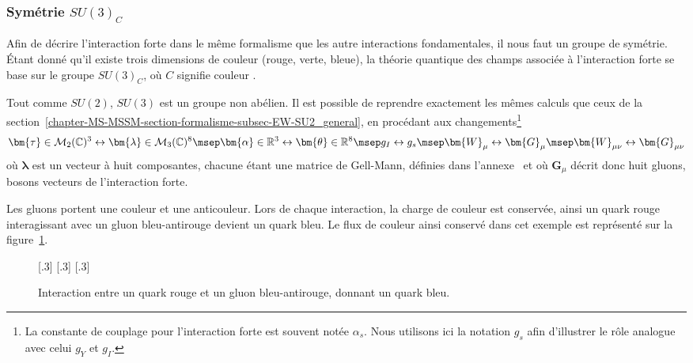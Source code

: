 \subsubsection{Symétrie $SU(3)_C$}\label{chapter-MS-MSSM-section-formalisme-subsec-QCD-subsubsec-SU3C}
Afin de décrire l'interaction forte dans le même formalisme que les autre interactions fondamentales, il nous faut un groupe de symétrie. Étant donné qu'il existe trois dimensions de couleur (rouge, verte, bleue), la théorie quantique des champs associée à l'interaction forte se base sur le groupe $SU(3)_C$, où $C$ signifie \og couleur \fg.
\par Tout comme $SU(2)$, $SU(3)$ est un groupe non abélien. Il est possible de reprendre exactement les mêmes calculs que ceux de la section~\ref{chapter-MS-MSSM-section-formalisme-subsec-EW-SU2_general}, en procédant aux changements\footnote{La constante de couplage pour l'interaction forte est souvent notée $\alpha_s$. Nous utilisons ici la notation $g_s$ afin d'illustrer le rôle analogue avec celui $g_Y$ et $g_I$.}
\begin{equation}
\bm{\tau} \in \mathcal{M}_2(\mathbb{C})^3 \leftrightarrow \bm{\lambda} \in \mathcal{M}_3(\mathbb{C})^8
\msep
\bm{\alpha}\in\mathbb{R}^3 \leftrightarrow \bm{\theta}\in\mathbb{R}^8
\msep
g_I \leftrightarrow g_s
\msep
\bm{W}_\mu \leftrightarrow \bm{G}_\mu
\msep
\bm{W}_{\mu\nu} \leftrightarrow \bm{G}_{\mu\nu}
\label{eq-hapter-MS-MSSM-section-formalisme-subsec-QCD-subsubsec-SU3C-analogieSU2}
\end{equation}
où $\bm{\lambda}$ est un vecteur à huit composantes, chacune étant une matrice de Gell-Mann, définies dans l'annexe~ et où $\bm{G}_\mu$ décrit donc huit gluons, bosons vecteurs de l'interaction forte.
\par Les gluons portent une couleur et une anticouleur. Lors de chaque interaction, la charge de couleur est conservée, ainsi un quark rouge interagissant avec un gluon bleu-antirouge devient un quark bleu. Le flux de couleur ainsi conservé dans cet exemple est représenté sur la figure~\ref{fig-fgraph-QCD_color_flux}.
\begin{figure}[h]
\centering
\vspace{\baselineskip}
[.3\textwidth]
{\vspace{\baselineskip}}
\hfill
{}[.3\textwidth]
{\vspace{\baselineskip}}
\hfill
{}[.3\textwidth]
{\vspace{\baselineskip}}

\caption{Interaction entre un quark rouge et un gluon bleu-antirouge, donnant un quark bleu.}
\label{fig-fgraph-QCD_color_flux}
\end{figure}


